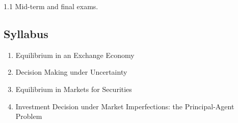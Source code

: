 \documentclass[12pt]{article}
\begin{document}
\begin{spacing}{1.1}
Mid-term and final exams. 



\subsection*{Syllabus}

\begin{enumerate}
\item Equilibrium in an Exchange Economy
\item Decision Making under Uncertainty
\item Equilibrium in Markets for Securities
\item Investment Decision under Market Imperfections: the Principal-Agent Problem
\end{enumerate}











\end{spacing}
\end{document}

